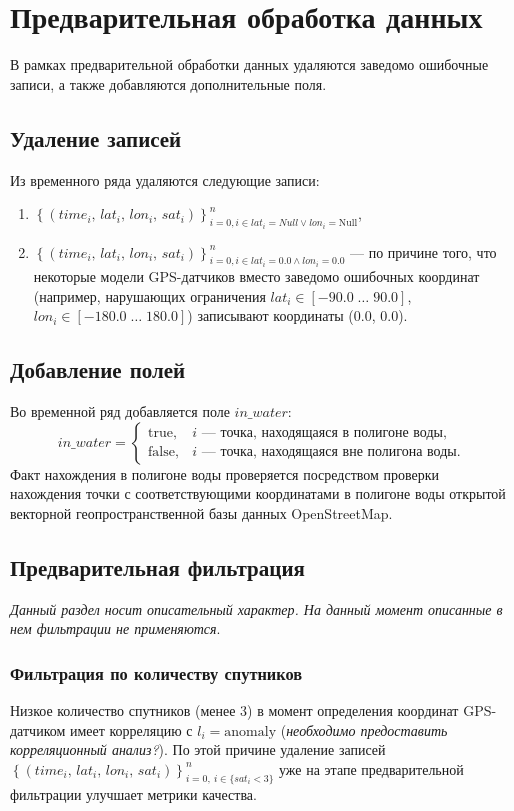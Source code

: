 \documentclass[a4paper,12pt]{report}
\begin{document}
	\section{Предварительная обработка данных}
	В рамках предварительной обработки данных удаляются заведомо ошибочные записи, а также добавляются дополнительные поля.

	\subsection{Удаление записей}
	Из временного ряда удаляются следующие записи:
	\begin{enumerate}
		\item $\left\{\left(\mathit{time}_i,\, \mathit{lat}_i,\, \mathit{lon}_i,\, \mathit{sat}_i\right) \right\}_{i=0, i \in {lat_i = Null \lor lon_i = \mathrm{Null}}}^{n}$,
		\item $\left\{\left(\mathit{time}_i,\, \mathit{lat}_i,\, \mathit{lon}_i,\, \mathit{sat}_i\right) \right\}_{i=0, i \in {lat_i = 0.0 \land lon_i = 0.0}}^{n}$ --- по причине того, что некоторые модели GPS-датчиков вместо заведомо ошибочных координат (например, нарушающих ограничения $lat_i \in [-90.0 \; \ldots \; 90.0]$, $lon_i \in [-180.0 \; \ldots \; 180.0]$) записывают координаты (0.0, 0.0).
	\end{enumerate}

	\subsection{Добавление полей}
	Во временной ряд добавляется поле $in\_water$:
	\[
	in\_water  =
	\begin{cases}
		\mathrm{true},   & \text{$i$ --- точка, находящаяся в полигоне воды},\\
		\mathrm{false}, & \text{$i$ --- точка, находящаяся вне полигона воды}.
	\end{cases}
	\]
	Факт нахождения в полигоне воды проверяется посредством проверки нахождения точки с соответствующими координатами в полигоне воды открытой векторной геопространственной базы данных OpenStreetMap.

	\subsection{Предварительная фильтрация}
	\textit{Данный раздел носит описательный характер. На данный момент описанные в нем фильтрации не применяются}.
	\subsubsection{Фильтрация по количеству спутников}
	Низкое количество спутников (менее 3) в момент определения координат GPS-датчиком имеет корреляцию с $l_i = \mathrm{anomaly}$ (\textit{необходимо предоставить корреляционный анализ?}). По этой причине удаление записей $\left\{\left(\mathit{time}_i,\, \mathit{lat}_i,\, \mathit{lon}_i,\, \mathit{sat}_i\right) \right\}_{i=0,\ i \in \{sat_i < 3\}}^{n}$ уже на этапе предварительной фильтрации улучшает метрики качества.
\end{document}
